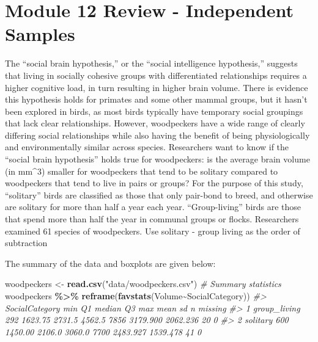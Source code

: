 \documentclass[
]{report}
\newenvironment{Shaded}{\begin{snugshade}}{\end{snugshade}}
\newcommand{\CommentTok}[1]{\textcolor[rgb]{0.56,0.35,0.01}{\textit{#1}}}
\newcommand{\FunctionTok}[1]{\textcolor[rgb]{0.13,0.29,0.53}{\textbf{#1}}}
\newcommand{\NormalTok}[1]{#1}
\newcommand{\OtherTok}[1]{\textcolor[rgb]{0.56,0.35,0.01}{#1}}
\newcommand{\SpecialCharTok}[1]{\textcolor[rgb]{0.81,0.36,0.00}{\textbf{#1}}}
\newcommand{\StringTok}[1]{\textcolor[rgb]{0.31,0.60,0.02}{#1}}
\begin{document}
\section{Module 12 Review - Independent Samples}\label{module-12-review---independent-samples}

The ``social brain hypothesis,'' or the ``social intelligence hypothesis,'' suggests that living in socially cohesive groups with differentiated relationships requires a higher cognitive load, in turn resulting in higher brain volume. There is evidence this hypothesis holds for primates and some other mammal groups, but it hasn't been explored in birds, as most birds typically have temporary social groupings that lack clear relationships. However, woodpeckers have a wide range of clearly differing social relationships while also having the benefit of being physiologically and environmentally similar across species. Researchers want to know if the ``social brain hypothesis'' holds true for woodpeckers: is the average brain volume (in mm\^{}3) smaller for woodpeckers that tend to be solitary compared to woodpeckers that tend to live in pairs or groups? For the purpose of this study, ``solitary'' birds are classified as those that only pair-bond to breed, and otherwise are solitary for more than half a year each year. ``Group-living'' birds are those that spend more than half the year in communal groups or flocks. Researchers examined 61 species of woodpeckers. Use solitary - group living as the order of subtraction

The summary of the data and boxplots are given below:

\begin{Shaded}
\begin{Highlighting}[]
\NormalTok{woodpeckers }\OtherTok{\textless{}{-}} \FunctionTok{read.csv}\NormalTok{(}\StringTok{"data/woodpeckers.csv"}\NormalTok{)}
\CommentTok{\# Summary statistics}
\NormalTok{woodpeckers }\SpecialCharTok{\%\textgreater{}\%} 
    \FunctionTok{reframe}\NormalTok{(}\FunctionTok{favstats}\NormalTok{(Volume}\SpecialCharTok{\textasciitilde{}}\NormalTok{SocialCategory))}
\CommentTok{\#\textgreater{}   SocialCategory min      Q1 median     Q3  max     mean       sd  n missing}
\CommentTok{\#\textgreater{} 1   group\_living 292 1623.75 2731.5 4562.5 7856 3179.900 2062.236 20       0}
\CommentTok{\#\textgreater{} 2       solitary 600 1450.00 2106.0 3060.0 7700 2483.927 1539.478 41       0}
\end{Highlighting}
\end{Shaded}
\end{document}

